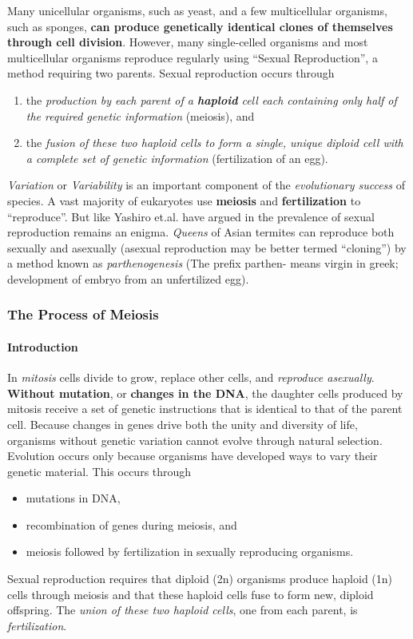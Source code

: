 \documentclass[12pt]{article}
\begin{document}
Many unicellular organisms, such as yeast, and a few multicellular organisms, such as sponges, \textbf{can produce genetically identical clones of themselves through cell division}. However, many single-celled organisms and most multicellular organisms reproduce regularly using ``Sexual Reproduction'', a method requiring two parents. Sexual reproduction occurs through
\begin{enumerate}
    \item the \emph{production by each parent of a \textbf{haploid} cell each containing only half of the required genetic information} (meiosis), and
    \item the \emph{fusion of these two haploid cells to form a single, unique diploid cell with a complete set of genetic information} (fertilization of an egg).
\end{enumerate}
\emph{Variation} or \emph{Variability} is an important component of the \emph{evolutionary success} of species. A vast majority of eukaryotes use \textbf{meiosis} and \textbf{fertilization} to ``reproduce''. But like Yashiro et.al. have argued in \cite{yashiro-matsuura} the prevalence of sexual reproduction remains an enigma. \emph{Queens} of Asian termites can reproduce both sexually and asexually (asexual reproduction may be better termed ``cloning'') by a method known as \emph{parthenogenesis} (The prefix parthen- means virgin in greek; development of embryo from an unfertilized egg).

\subsubsection{The Process of Meiosis}
\paragraph{Introduction}
In \emph{mitosis} cells divide to grow, replace other cells, and \emph{reproduce asexually}. \textbf{Without mutation}, or \textbf{changes in the DNA}, the daughter cells produced by mitosis receive a set of genetic instructions that is identical to that of the parent cell. Because changes in genes drive both the unity and diversity of life, organisms without genetic variation cannot evolve through natural selection. Evolution occurs only because organisms have developed ways to vary their genetic material. This occurs through 
\begin{itemize}
    \item mutations in DNA, 
    \item recombination of genes during meiosis, and 
    \item meiosis followed by fertilization in sexually reproducing organisms.
\end{itemize}
Sexual reproduction requires that diploid (2n) organisms produce haploid (1n) cells through meiosis and that these haploid cells fuse to form new, diploid offspring. The \emph{union of these two haploid cells}, one from each parent, is \emph{fertilization}.
\end{document}
